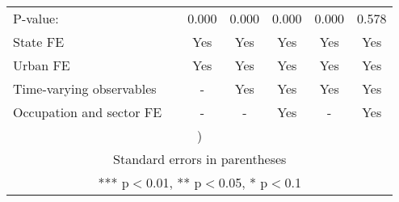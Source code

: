 \begin{tabular}{lcccccc}
\hspace{1mm} P-value: &  & 0.000 & 0.000 & 0.000 & 0.000 & 0.578 \\
State FE &  & Yes & Yes & Yes & Yes & Yes \\
Urban FE &  & Yes & Yes & Yes & Yes & Yes \\
Time-varying observables &  & - & Yes & Yes & Yes & Yes \\
 Occupation and sector FE &  & - & - & Yes & - & Yes \\ \hline
\multicolumn{7}{c}{ )} \\
\multicolumn{7}{c}{ Standard errors in parentheses} \\
\multicolumn{7}{c}{ *** p$<$0.01, ** p$<$0.05, * p$<$0.1} \\
\end{tabular}

